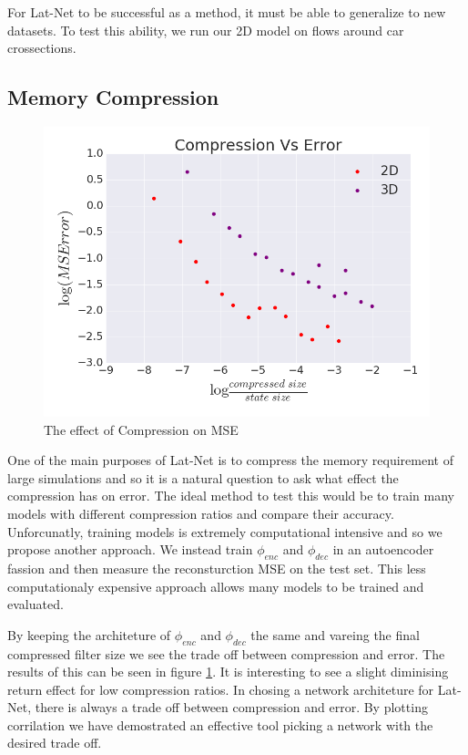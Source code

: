 \documentclass{article}
\begin{document}
For Lat-Net to be successful as a method, it must be able to generalize to new datasets. To test this ability, we run our 2D model on flows around car crossections. 

\subsection{Memory Compression}

\begin{figure}
  \centering
  \includegraphics[scale=0.3]{../test/figs/compression_error_plot.png}
  \caption{The effect of Compression on MSE}
  \label{compression_plot}
\end{figure}

One of the main purposes of Lat-Net is to compress the memory requirement of large simulations and so it is a natural question to ask what effect the compression has on error. The ideal method to test this would be to train many models with different compression ratios and compare their accuracy. Unforcunatly, training models is extremely computational intensive and so we propose another approach. We instead train $\phi_{enc}$ and $\phi_{dec}$ in an autoencoder fassion and then measure the reconsturction MSE on the test set. This less computationaly expensive approach allows many models to be trained and evaluated.

By keeping the architeture of $\phi_{enc}$ and $\phi_{dec}$ the same and vareing the final compressed filter size we see the trade off between compression and error. The results of this can be seen in figure \ref{compression_plot}. It is interesting to see a slight diminising return effect for low compression ratios. In chosing a network architeture for Lat-Net, there is always a trade off between compression and error. By plotting corrilation we have demostrated an effective tool picking a network with the desired trade off.
\end{document}
